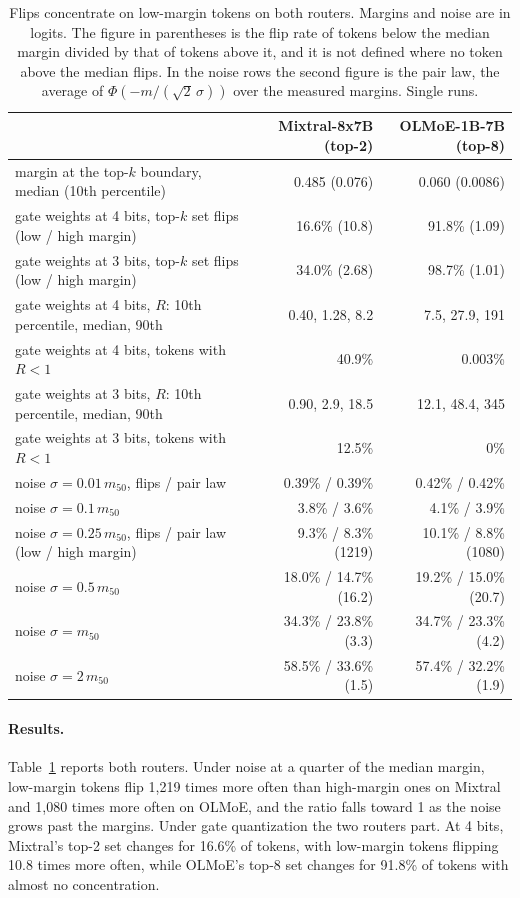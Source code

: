 \documentclass[journal]{IEEEtran}
\begin{document}
\begin{table}[t]
\centering
\caption{Flips concentrate on low-margin tokens on both routers. Margins and noise are
in logits. The figure in parentheses is the flip rate of tokens below the median margin divided
by that of tokens above it, and it is not defined where no token above the median flips. In the
noise rows the second figure is the pair law, the average of $\Phi(-m/(\sqrt2\,\sigma))$ over the
measured margins. Single runs.}
\label{tab:route}
\small
\begin{tabular}{lrr}
\toprule
 & Mixtral-8x7B (top-2) & OLMoE-1B-7B (top-8) \\
\midrule
margin at the top-$k$ boundary, median (10th percentile) & 0.485 (0.076) & 0.060 (0.0086) \\
gate weights at 4 bits, top-$k$ set flips (low / high margin) & 16.6\% (10.8) & 91.8\% (1.09) \\
gate weights at 3 bits, top-$k$ set flips (low / high margin) & 34.0\% (2.68) & 98.7\% (1.01) \\
gate weights at 4 bits, $R$: 10th percentile, median, 90th & 0.40, 1.28, 8.2 & 7.5, 27.9, 191 \\
gate weights at 4 bits, tokens with $R < 1$ & 40.9\% & 0.003\% \\
gate weights at 3 bits, $R$: 10th percentile, median, 90th & 0.90, 2.9, 18.5 & 12.1, 48.4, 345 \\
gate weights at 3 bits, tokens with $R < 1$ & 12.5\% & 0\% \\
noise $\sigma = 0.01\,m_{50}$, flips / pair law & 0.39\% / 0.39\% & 0.42\% / 0.42\% \\
noise $\sigma = 0.1\,m_{50}$ & 3.8\% / 3.6\% & 4.1\% / 3.9\% \\
noise $\sigma = 0.25\,m_{50}$, flips / pair law (low / high margin) & 9.3\% / 8.3\% (1219) & 10.1\% / 8.8\% (1080) \\
noise $\sigma = 0.5\,m_{50}$ & 18.0\% / 14.7\% (16.2) & 19.2\% / 15.0\% (20.7) \\
noise $\sigma = m_{50}$ & 34.3\% / 23.8\% (3.3) & 34.7\% / 23.3\% (4.2) \\
noise $\sigma = 2\,m_{50}$ & 58.5\% / 33.6\% (1.5) & 57.4\% / 32.2\% (1.9) \\
\bottomrule
\end{tabular}
\end{table}

\paragraph{Results.} Table~\ref{tab:route} reports both routers. Under noise at a quarter of
the median margin, low-margin tokens flip 1{,}219 times more often than high-margin ones on Mixtral
and 1{,}080 times more often on OLMoE, and the ratio falls toward 1 as the noise grows past the
margins. Under gate quantization the two routers part. At 4 bits, Mixtral's top-2 set changes for
16.6\% of tokens, with low-margin tokens flipping 10.8 times more often, while OLMoE's top-8 set
changes for 91.8\% of tokens with almost no concentration.
\end{document}
